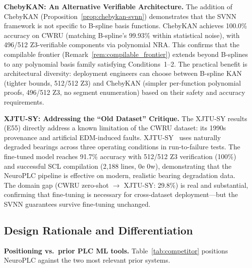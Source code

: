 \documentclass[journal,onecolumn]{IEEEtran}
\newcommand{\neuroplc}{NeuroPLC\xspace}
\begin{document}
\textbf{ChebyKAN: An Alternative Verifiable Architecture.}
The addition of ChebyKAN (Proposition~\ref{prop:chebykan-svnn}) demonstrates
that the SVNN framework is not specific to B-spline basis functions.
ChebyKAN achieves 100.0\% accuracy on CWRU (matching B-spline's 99.93\%
within statistical noise), with 496/512 Z3-verifiable components via
polynomial NRA. This confirms that the compilable frontier
(Remark~\ref{rem:compilable_frontier}) extends beyond B-splines to any
polynomial basis family satisfying Conditions~1--2. The practical benefit
is architectural diversity: deployment engineers can choose between
B-spline KAN (tighter bounds, 512/512 Z3) and ChebyKAN (simpler per-function
polynomial proofs, 496/512 Z3, no segment enumeration) based on their
safety and accuracy requirements.

\textbf{XJTU-SY: Addressing the ``Old Dataset'' Critique.}
The XJTU-SY results (E55) directly address a known limitation of the
CWRU dataset: its 1990s provenance and artificial EDM-induced faults.
XJTU-SY~\cite{xjtusy2020} uses naturally degraded bearings across three
operating conditions in run-to-failure tests. The fine-tuned model reaches
91.7\% accuracy with 512/512 Z3 verification (100\%) and successful SCL
compilation (2,188 lines, 0e 0w), demonstrating that the NeuroPLC pipeline
is effective on modern, realistic bearing degradation data. The domain gap
(CWRU zero-shot $\to$ XJTU-SY: 29.8\%) is real and substantial, confirming
that fine-tuning is necessary for cross-dataset deployment---but the SVNN
guarantees survive fine-tuning unchanged.

\subsection{Design Rationale and Differentiation}
\label{sec:design-rationale}

\noindent\textbf{Positioning vs.\ prior PLC ML tools.}
Table~\ref{tab:competitor} positions \neuroplc against the two most
relevant prior systems.
\end{document}
